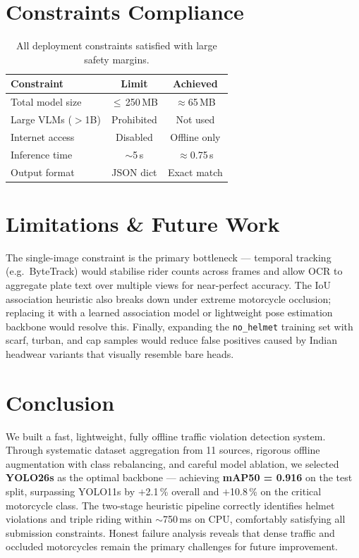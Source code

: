 \documentclass[10pt,a4paper,twocolumn]{article}
\begin{document}
\section{Constraints Compliance}
\vspace{-1mm}
\begin{table}[H]
\centering
\setlength{\tabcolsep}{5pt}
\begin{tabular}{@{}lcc@{}}
\toprule
\textbf{Constraint} & \textbf{Limit} & \textbf{Achieved} \\
\midrule
Total model size   & $\leq$\,250\,MB & $\approx$65\,MB \\
Large VLMs ($>$1B) & Prohibited & Not used \\
Internet access    & Disabled & Offline only \\
Inference time     & $\sim$5\,s & $\approx$0.75\,s \\
Output format      & JSON dict & Exact match \\
\bottomrule
\end{tabular}
\caption{All deployment constraints satisfied with large safety margins.}
\end{table}

\section{Limitations \& Future Work}
The single-image constraint is the primary bottleneck — temporal tracking (e.g.\ ByteTrack) would stabilise rider counts across frames and allow OCR to aggregate plate text over multiple views for near-perfect accuracy. The IoU association heuristic also breaks down under extreme motorcycle occlusion; replacing it with a learned association model or lightweight pose estimation backbone would resolve this. Finally, expanding the \texttt{no\_helmet} training set with scarf, turban, and cap samples would reduce false positives caused by Indian headwear variants that visually resemble bare heads.

\section{Conclusion}
We built a fast, lightweight, fully offline traffic violation detection system. Through systematic dataset aggregation from 11 sources, rigorous offline augmentation with class rebalancing, and careful model ablation, we selected \textbf{YOLO26s} as the optimal backbone — achieving \textbf{mAP50 = 0.916} on the test split, surpassing YOLO11s by $+$2.1\,\% overall and $+$10.8\,\% on the critical motorcycle class. The two-stage heuristic pipeline correctly identifies helmet violations and triple riding within $\sim$750\,ms on CPU, comfortably satisfying all submission constraints. Honest failure analysis reveals that dense traffic and occluded motorcycles remain the primary challenges for future improvement.
\end{document}
